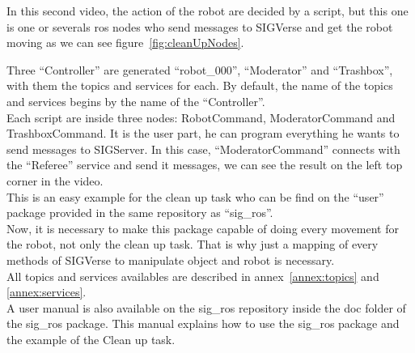 In this second video, the action of the robot are decided by a script, but this one is one or severals ros nodes who send messages to SIGVerse and get the robot moving as we can see figure~\ref{fig:cleanUpNodes}.\\

\noindent\begin{minipage}{\linewidth}%
\label{fig:cleanUpNodes}%
\end{minipage}

Three ``Controller'' are generated ``robot\_000'', ``Moderator'' and ``Trashbox'', with them the topics and services for each. By default, the name of the topics and services begins by the name of the ``Controller''.\\
Each script are inside three nodes: RobotCommand, ModeratorCommand and TrashboxCommand. It is the user part, he can program everything he wants to send messages to SIGServer. In this case, ``ModeratorCommand'' connects with the ``Referee'' service and send it messages, we can see the result on the left top corner in the video.\\
This is an easy example for the clean up task who can be find on the ``user'' package provided in the same repository as ``sig\_ros''.\\

Now, it is necessary to make this package capable of doing every movement for the robot, not only the clean up task. That is why just a mapping of every methods of SIGVerse to manipulate object and robot is necessary.\\
All topics and services availables are described in annex~\ref{annex:topics} and \ref{annex:services}.\\
A user manual is also available on the sig\_ros repository inside the doc folder of the sig\_ros package. This manual explains how to use the sig\_ros package and the example of the Clean up task.

